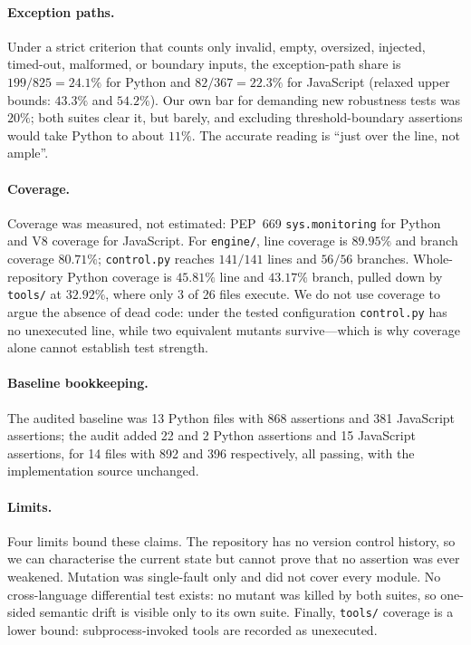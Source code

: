\paragraph{Exception paths.} Under a strict criterion that counts only invalid,
empty, oversized, injected, timed-out, malformed, or boundary inputs, the
exception-path share is $199/825=24.1\%$ for Python and $82/367=22.3\%$ for
JavaScript (relaxed upper bounds: $43.3\%$ and $54.2\%$). Our own bar for
demanding new robustness tests was $20\%$; both suites clear it, but barely, and
excluding threshold-boundary assertions would take Python to about $11\%$. The
accurate reading is ``just over the line, not ample''.

\paragraph{Coverage.} Coverage was measured, not estimated: PEP~669
\texttt{sys.monitoring} for Python and V8 coverage for JavaScript. For
\texttt{engine/}, line coverage is $89.95\%$ and branch coverage $80.71\%$;
\texttt{control.py} reaches $141/141$ lines and $56/56$ branches. Whole-repository
Python coverage is $45.81\%$ line and $43.17\%$ branch, pulled down by
\texttt{tools/} at $32.92\%$, where only 3 of 26 files execute. We do not
use coverage to argue the absence of dead code: under the tested configuration
\texttt{control.py} has no unexecuted line, while two equivalent mutants
survive---which is why coverage alone cannot establish test strength.

\paragraph{Baseline bookkeeping.} The audited baseline was 13 Python files with
868 assertions and 381 JavaScript assertions; the audit added 22 and 2 Python
assertions and 15 JavaScript assertions, for 14 files with 892 and 396
respectively, all passing, with the implementation source unchanged.

\paragraph{Limits.} Four limits bound these claims. The repository has no version
control history, so we can characterise the current state but cannot prove that
no assertion was ever weakened. Mutation was single-fault only and did not cover
every module. No cross-language differential test exists: no mutant was killed
by both suites, so one-sided semantic drift is visible only to its own suite.
Finally, \texttt{tools/} coverage is a lower bound: subprocess-invoked tools are
recorded as unexecuted.

